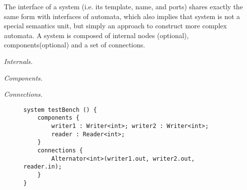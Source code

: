 The interface of a system (i.e. its template, name, and ports) shares exactly the same form with interfaces of automata, which also implies that system is not a special semantics unit, but simply an approach to construct more complex automata. A system is composed of internal nodes (optional), components(optional) and a set of connections.

\vspace{0.2cm}
\noindent\emph{Internals.}
\vspace{0.2cm}

\noindent\emph{Components.}
\vspace{0.2cm}

\noindent\emph{Connections.}

\begin{example}[Alternator]
\begin{figure}
    \begin{CenteredBox}
    
    \end{CenteredBox}
\end{figure}
\end{example}

\begin{figure}
    \begin{CenteredBox}
    \begin{lstlisting}
system testBench () {
    components {
        writer1 : Writer<int>; writer2 : Writer<int>;
        reader : Reader<int>;
    }
    connections {
        Alternator<int>(writer1.out, writer2.out, reader.in);
    }
}
    \end{lstlisting}
    \end{CenteredBox}
\end{figure}

\label{subsec:functions}
